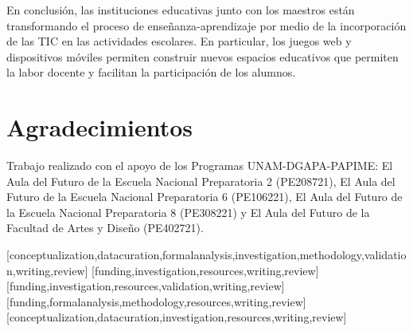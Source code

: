 \documentclass[spanish]{textolivre}
\begin{document}
En conclusión, las instituciones educativas junto con los maestros están transformando el proceso de enseñanza-aprendizaje por medio de la incorporación de las  TIC en las actividades escolares. En particular, los juegos web y dispositivos móviles  permiten construir nuevos espacios educativos que permiten la labor docente y facilitan la participación de los alumnos.

\section*{Agradecimientos}
Trabajo realizado con el apoyo de los Programas UNAM-DGAPA-PAPIME: El Aula del Futuro de la Escuela Nacional Preparatoria 2 (PE208721), El Aula del Futuro de la Escuela Nacional Preparatoria 6 (PE106221), El Aula del Futuro de la Escuela Nacional Preparatoria 8 (PE308221) y El Aula del Futuro de la Facultad de Artes y Diseño (PE402721).


\printbibliography\label{sec-bib}


\begin{contributors}
[conceptualization,datacuration,formalanalysis,investigation,methodology,validation,writing,review]
[funding,investigation,resources,writing,review]
[funding,investigation,resources,validation,writing,review]
[funding,formalanalysis,methodology,resources,writing,review]
[conceptualization,datacuration,investigation,resources,writing,review]

\end{contributors}
\end{document}
